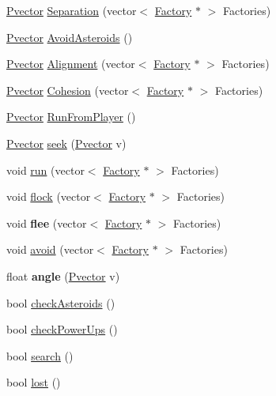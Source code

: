 \begin{DoxyCompactItemize}
\item 
\hyperlink{class_pvector}{Pvector} \hyperlink{class_factory_a541bd19bbf8204701803fe968f7d9ae6}{Separation} (vector$<$ \hyperlink{class_factory}{Factory} $\ast$ $>$ Factories)
\item 
\hyperlink{class_pvector}{Pvector} \hyperlink{class_factory_ac3824a01520f07a775f8d9c19a04c9d8}{Avoid\+Asteroids} ()
\item 
\hyperlink{class_pvector}{Pvector} \hyperlink{class_factory_a1985a69e3bb3a94310b1f74a600278b8}{Alignment} (vector$<$ \hyperlink{class_factory}{Factory} $\ast$ $>$ Factories)
\item 
\hyperlink{class_pvector}{Pvector} \hyperlink{class_factory_abe4d8a949ce1b5abfe27329e101fc677}{Cohesion} (vector$<$ \hyperlink{class_factory}{Factory} $\ast$ $>$ Factories)
\item 
\hyperlink{class_pvector}{Pvector} \hyperlink{class_factory_a000db043bafb67f03488e136e76313a2}{Run\+From\+Player} ()
\item 
\hyperlink{class_pvector}{Pvector} \hyperlink{class_factory_a8f2559f32405a588dcc24fa48ae82993}{seek} (\hyperlink{class_pvector}{Pvector} v)
\item 
void \hyperlink{class_factory_a2ea7fe12ecb2121edd800719f14e5b6f}{run} (vector$<$ \hyperlink{class_factory}{Factory} $\ast$ $>$ Factories)
\item 
void \hyperlink{class_factory_ad6f23bb5f097400e9a53d110ba5aabec}{flock} (vector$<$ \hyperlink{class_factory}{Factory} $\ast$ $>$ Factories)
\item 
void {\bfseries flee} (vector$<$ \hyperlink{class_factory}{Factory} $\ast$ $>$ Factories)\hypertarget{class_factory_a24af5488d48931649999873d75bccb4e}{}\label{class_factory_a24af5488d48931649999873d75bccb4e}

\item 
void \hyperlink{class_factory_afa83df7b9a8d8e470556666274dabcbe}{avoid} (vector$<$ \hyperlink{class_factory}{Factory} $\ast$ $>$ Factories)
\item 
float {\bfseries angle} (\hyperlink{class_pvector}{Pvector} v)\hypertarget{class_factory_a3e629119e97a9f8978858e672f863de7}{}\label{class_factory_a3e629119e97a9f8978858e672f863de7}

\item 
bool \hyperlink{class_factory_a231806bcd800e479008ee2e711c4d57b}{check\+Asteroids} ()
\item 
bool \hyperlink{class_factory_a150d9644dacccb03f6aa969705299125}{check\+Power\+Ups} ()
\item 
bool \hyperlink{class_factory_a561fa89b3c4165fd2c176e0127d9422a}{search} ()
\item 
bool \hyperlink{class_factory_aa268ea6c9d11f0b908a0a6af3b8cbb8c}{lost} ()
\end{DoxyCompactItemize}
